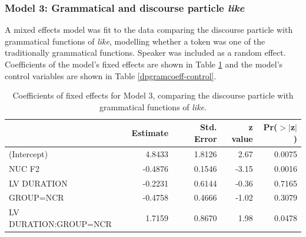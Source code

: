 



\subsubsection{Model 3: Grammatical and discourse particle \textit{like}}


A mixed effects model was fit to the data comparing the discourse particle with grammatical functions of \textit{like}, modelling whether a token was one of the traditionally grammatical functions.  Speaker was included as a random effect.  Coefficients of the model's fixed effects are shown in Table \ref{dpgramcoeff} and the model's control variables are shown in Table \ref{dpgramcoeff-control}.  


\begin{table}[ht]
\begin{center}
\begin{tabular}{lrrrr}
  \hline
 & Estimate & Std. Error & z value & Pr($>$$|$z$|$) \\
  \hline
(Intercept)    &  4.8433  &  1.8126 &  2.67&  0.0075\\ 
NUC F2       &  -0.4876 &  0.1546 & -3.15& 0.0016 \\ 
LV DURATION       &  -0.2231 &  0.6144 & -0.36& 0.7165 \\
GROUP=NCR                 &-0.4758   &  0.4666 & -1.02& 0.3079 \\ 
LV DURATION:GROUP=NCR     &  1.7159  &  0.8670 &  1.98& 0.0478 \\  
   \hline
\end{tabular}
\caption{Coefficients of fixed effects for Model 3, comparing the discourse particle with grammatical functions of \textit{like}.}
\label{dpgramcoeff}
\end{center}
\end{table}


